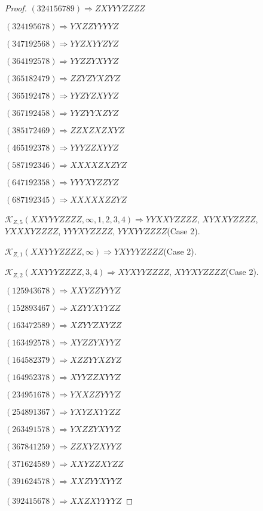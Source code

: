 \documentclass[12pt]{article}
\theoremstyle{plain}
\theoremstyle{definition}
\theoremstyle{remark}
\newcommand{\fancy}[1]{\mathcal{#1}}
\def\K{\fancy{K}}
\begin{document}
\begin{proof}
	$(3 2 4 1 5 6 7 8 9)\Rightarrow ZXYYYZZZZ$
	
	$(3 2 4 1 9 5 6 7 8)\Rightarrow YXZZYYYYZ$
	
	$(3 4 7 1 9 2 5 6 8)\Rightarrow YYZXYYZYZ$
	
	$(3 6 4 1 9 2 5 7 8)\Rightarrow YYZZYXYYZ$
	
	$(3 6 5 1 8 2 4 7 9)\Rightarrow ZZYZYXZYZ$
	
	$(3 6 5 1 9 2 4 7 8)\Rightarrow YYZYZXYYZ$
	
	$(3 6 7 1 9 2 4 5 8)\Rightarrow YYZYYXZYZ$
	
	$(3 8 5 1 7 2 4 6 9)\Rightarrow ZZXZXZXYZ$
	
	$(4 6 5 1 9 2 3 7 8)\Rightarrow YYYZZXYYZ$
	
	$(5 8 7 1 9 2 3 4 6)\Rightarrow XXXXZXZYZ$
	
	$(6 4 7 1 9 2 3 5 8)\Rightarrow YYYXYZZYZ$
	
	$(6 8 7 1 9 2 3 4 5)\Rightarrow XXXXXZZYZ$
	
	
	
	$\K_{Z,5}(XXYYYZZZZ,\infty,1, 2, 3, 4)\Rightarrow $$YYXXYZZZZ$, $XYXXYZZZZ$, $YXXXYZZZZ$, $YYYXYZZZZ$, $YYXYYZZZZ$(Case 2).
	
	$\K_{Z,1}(XXYYYZZZZ,\infty)\Rightarrow $$YXYYYZZZZ$(Case 2).
	
	$\K_{Z,2}(XXYYYZZZZ,3, 4)\Rightarrow $$XYXYYZZZZ$, $XYYXYZZZZ$(Case 2).
	
	
	
	$(1 2 5 9 4 3 6 7 8)\Rightarrow XXYZZYYYZ$
	
	$(1 5 2 8 9 3 4 6 7)\Rightarrow XZYYXYYZZ$
	
	$(1 6 3 4 7 2 5 8 9)\Rightarrow XZYYZXYZZ$
	
	$(1 6 3 4 9 2 5 7 8)\Rightarrow XYZZYXYYZ$
	
	$(1 6 4 5 8 2 3 7 9)\Rightarrow XZZYYXZYZ$
	
	$(1 6 4 9 5 2 3 7 8)\Rightarrow XYYZZXYYZ$
	
	$(2 3 4 9 5 1 6 7 8)\Rightarrow YXXZZYYYZ$
	
	$(2 5 4 8 9 1 3 6 7)\Rightarrow YXYZXYYZZ$
	
	$(2 6 3 4 9 1 5 7 8)\Rightarrow YXZZYXYYZ$
	
	$(3 6 7 8 4 1 2 5 9)\Rightarrow ZZXYZXYYZ$
	
	$(3 7 1 6 2 4 5 8 9)\Rightarrow XXYZZXYZZ$
	
	$(3 9 1 6 2 4 5 7 8)\Rightarrow XXZYYXYYZ$
	
	$(3 9 2 4 1 5 6 7 8)\Rightarrow XXZXYYYYZ$
	

\end{proof}
\end{document}
